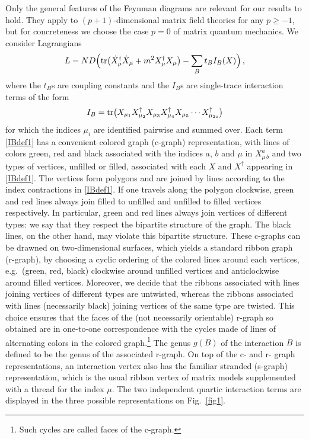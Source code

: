 \documentclass[12pt]{article}
\numberwithin{equation}{section}
\def\be{\begin{equation}}\def\ee{\end{equation}}
\begin{document}
Only the general features of the Feynman diagrams are relevant for our results to hold. They apply to $(p+1)$-dimensional matrix field theories for any $p\geq -1$, but for concreteness we choose the case $p=0$ of matrix quantum mechanics. We consider Lagrangians 
%
\be\label{typicalH} L =ND\Bigl( \tr\bigl(\dot X_{\mu}^{\dagger}\dot X_{\mu}+m^{2}X_{\mu}^{\dagger}X_{\mu}\bigr) - \sum_{B}t_{B}I_{B}(X)\Bigr)\, ,\ee
%
where the $t_{B}$s are coupling constants and the $I_{B}$s are single-trace interaction terms of the form
%
\be\label{IBdef1} I_{B} = \tr\bigl( X_{\mu_{1}}X_{\mu_{2}}^{\dagger}X_{\mu_{3}}X_{\mu_{4}}^{\dagger}X_{\mu_{5}}\cdots X_{\mu_{2s}}^{\dagger}\bigr)\ee
%
for which the indices $\mu_{i}$ are identified pairwise and summed over. Each term \eqref{IBdef1} has a convenient colored graph (c-graph) representation, with lines of colors green, red and black associated with the indices $a$, $b$ and $\mu$ in $X^{a}_{\mu\, b}$ and two types of vertices, unfilled or filled, associated with each $X$ and $X^{\dagger}$ appearing in \eqref{IBdef1}. The vertices form polygons and are joined by lines according to the index contractions in \eqref{IBdef1}. If one travels along the polygon clockwise, green and red lines always join filled to unfilled and unfilled to filled vertices respectively. In particular, green and red lines always join vertices of different types: we say that they respect the bipartite structure of the graph. The black lines, on the other hand, may violate this bipartite structure. These c-graphs can be drawned on two-dimensional surfaces, which yields a standard ribbon graph (r-graph), by choosing a cyclic ordering of the colored lines around each vertices, e.g.\ (green, red, black) clockwise around unfilled vertices and anticlockwise around filled vertices. Moreover, we decide that the ribbons associated with lines joining vertices of different types are untwisted, whereas the ribbons associated with lines (necessarily black) joining vertices of the same type are twisted. This choice ensures that the faces of the (not necessarily orientable) r-graph so obtained are in one-to-one correspondence with the cycles made of lines of alternating colors in the colored graph.\footnote{Such cycles are called faces of the c-graph.} The genus $g(B)$ of the interaction $B$ is defined to be the genus of the associated r-graph. On top of the c- and r- graph representations, an interaction vertex also has the familiar stranded (s-graph) representation, which is the usual ribbon vertex of matrix models supplemented with a thread for the index $\mu$. The two independent quartic interaction terms are displayed in the three possible representations on Fig.\ \ref{fig1}.
\end{document}

